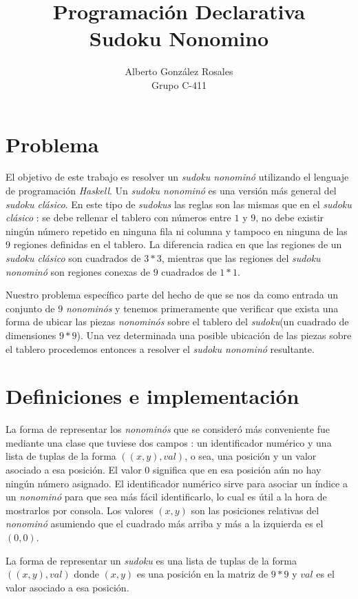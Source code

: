 \documentclass[12pt]{article}
\title{\bf\huge Programaci\'on Declarativa \\Sudoku Nonomino}
\author{\Large Alberto Gonz\'alez Rosales\\
	\large {Grupo C-411}
	}
\date{}
\begin{document}
\maketitle

\section{Problema}
El objetivo de este trabajo es resolver un \emph{sudoku nonomin\'o} utilizando el lenguaje de programaci\'on \emph{Haskell}. Un \emph{sudoku nonomin\'o} es una versi\'on m\'as general del \emph{sudoku cl\'asico}. En este tipo de \emph{sudokus} las reglas son las mismas que en el \emph{sudoku cl\'asico} : se debe rellenar el tablero con n\'umeros entre $1$ y $9$, no debe existir ning\'un n\'umero repetido en ninguna fila ni columna y tampoco en ninguna de las $9$ regiones definidas en el tablero. La diferencia radica en que las regiones de un \emph{sudoku cl\'asico} son cuadrados de $3*3$, mientras que las regiones del \emph{sudoku nonomin\'o} son regiones conexas de $9$ cuadrados de $1*1$.

Nuestro problema espec\'ifico parte del hecho de que se nos da como entrada un conjunto de $9$ \emph{nonomin\'os} y tenemos primeramente que verificar que exista una forma de ubicar las piezas \emph{nonomin\'os} sobre el tablero del \emph{sudoku}(un cuadrado de dimensiones $9*9$). Una vez determinada una posible ubicaci\'on de las piezas sobre el tablero procedemos entonces a resolver el \emph{sudoku nonomin\'o} resultante.

\section{Definiciones e implementaci\'on }
La forma de representar los \emph{nonomin\'os} que se consider\'o m\'as conveniente fue mediante una clase que tuviese dos campos : un identificador num\'erico y una lista de tuplas de la forma $((x, y), val)$, o sea, una posici\'on y un valor asociado a esa posici\'on. El valor $0$ significa que en esa posici\'on a\'un no hay ning\'un n\'umero asignado. El identificador num\'erico sirve para asociar un \'indice a un \emph{nonomin\'o} para que sea m\'as f\'acil identificarlo, lo cual es \'util a la hora de mostrarlos por consola. Los valores $(x, y)$ son las posiciones relativas del \emph{nonomin\'o} asumiendo que el cuadrado m\'as arriba y m\'as a la izquierda es el $(0, 0)$.

La forma de representar un \emph{sudoku} es una lista de tuplas de la forma $((x, y), val)$ donde $(x, y)$ es una posici\'on en la matriz de $9*9$ y $val$ es el valor asociado a esa posici\'on.
\end{document}
